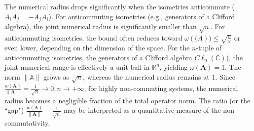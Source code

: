 \documentclass[12pt]{article}
\begin{document}
The numerical radius drops significantly when the isometries anticommute ($A_i A_j = -A_j A_i$).
For anticommuting isometries (e.g., generators of a Clifford algebra), the joint numerical radius is significantly smaller than $\sqrt{n}$.
For anticommuting isometries, the bound often reduces toward $\omega(\mathbb(A))\leq \sqrt{\frac{n}{2}} $
or even lower, depending on the dimension of the space.
For the $n$-tuple of anticommuting isometries, the generators of a Clifford algebra $C\ell_n(\mathbb{C})$), the joint numerical range is effectively a unit ball in $\mathbb{R}^n$, yielding
$ \omega(\mathbf{A}) = 1$.
The norm $\|\mathbb{A}\|$ grows as $\sqrt{n}$, whereas the numerical radius remains at $1$.
Since $\frac{w(\mathbf{A})}{\|\mathbf{A}\|} = \frac{1}{\sqrt{n}}\rightarrow 0, n\rightarrow +\infty$, for highly non-commuting systems, the numerical radius becomes a negligible fraction of the total operator norm.
The ratio (or the ``gap") $\frac{w(\mathbf{A})}{\|\mathbf{A}\|} = \frac{1}{\sqrt{n}}$  may be interpreted as a quantitative measure of the non-commutativity.
\end{document}
